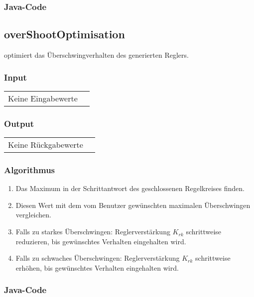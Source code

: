 \subsubsection*{Java-Code}



\subsection{overShootOptimisation}

   optimiert    das   \"Uberschwingverhalten   des
generierten Reglers.

\subsubsection*{Input}

\begin{tabular}{p{40mm}l}
    Keine Eingabewerte &
\end{tabular}

\subsubsection*{Output}
\begin{tabular}{p{40mm}l}
    Keine R\"uckgabewerte &
\end{tabular}

\subsubsection*{Algorithmus}
\begin{enumerate}
    \item
        Das Maximum in der Schrittantwort des geschlossenen Regelkreises finden.
    \item
        Diesen Wert mit dem vom Benutzer gew\"unschten maximalen \"Uberschwingen vergleichen.
    \item
        Falls   zu   starkes   \"Uberschwingen: Reglerverst\"arkung   $K_{rk}$
        schrittweise reduzieren, bis gew\"unschtes Verhalten eingehalten wird.
    \item
        Falls   zu  schwaches   \"Uberschwingen: Reglerverst\"arkung  $K_{rk}$
        schrittweise erh\"ohen, bis gew\"unschtes Verhalten eingehalten wird.
\end{enumerate}

\subsubsection*{Java-Code}

